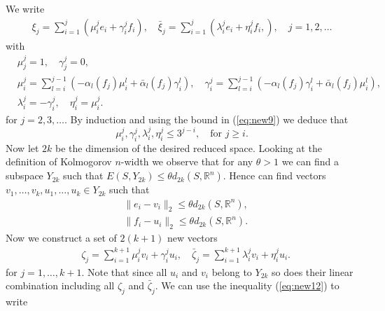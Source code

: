 We write
\begin{equation} \label{eq:new10}
\begin{aligned}
	\xi_j = \sum_{i=1}^j \left( \mu_i^j e_i + \gamma_i^j f_i \right), \quad \bar{\xi}_j = \sum_{i=1}^j \left( \lambda_i^j e_i + \eta_i^j f_i,  \right), \quad j=1,2,\dots
\end{aligned}
\end{equation}
with
\begin{equation} \label{eq:new11}
\begin{aligned}
	&\mu^j_j = 1, \quad \gamma^j_j = 0, \\
	&\mu_i^j = \sum_{l=i}^{j-1}\left( - \alpha_l(f_j) \mu_i^l  + \bar{\alpha}_l(f_j) \gamma_i^l \right), \quad\gamma_i^j = \sum_{l=i}^{j-1}\left( - \alpha_l(f_j) \gamma_i^l  + \bar{\alpha}_l(f_j) \mu_i^l \right), \\
	&\lambda^j_i = - \gamma ^j_i, \quad \eta^j_i = \mu^j_i.
\end{aligned}
\end{equation}
for $j=2,3,\dots$. By induction and using the bound in (\ref{eq:new9}) we deduce that
\begin{equation} \label{eq:new12}
	\mu^j_i,\gamma^j_i,\lambda^j_i,\eta^j_i \leq 3^{j-i}, \quad \text{for } j\geq i.
\end{equation}
Now let $2k$ be the dimension of the desired reduced space. Looking at the definition of Kolmogorov $n$-width we observe that for any $\theta > 1$ we can find a subspace $Y_{2k}$ such that $E(S,Y_{2k}) \leq \theta d_{2k}(S,\mathbb R^n)$. Hence can find vectors $v_1,\dots,v_k,u_1,\dots,u_k\in Y_{2k}$ such that
\begin{equation} \label{eq:new13}
\begin{aligned}
	& \|e_i - v_i\|_2 \leq \theta d_{2k}(S,\mathbb R^n), \\
	& \|f_i - u_i\|_2 \leq \theta d_{2k}(S,\mathbb R^n).
\end{aligned}
\end{equation}
Now we construct a set of $2(k+1)$ new vectors
\begin{equation} \label{eq:new14}
\begin{aligned}
	& \zeta_j = \sum_{i=1}^{k+1} \mu_i^j v_i + \gamma^j_i u_i,\quad \bar{\zeta}_j = \sum_{i=1}^{k+1} \lambda_i^j v_i + \eta^j_i u_i.
\end{aligned}
\end{equation}
for $j = 1,\dots,k+1$. Note that since all $u_i$ and $v_i$ belong to $Y_{2k}$ so does their linear combination including all $\zeta_j$ and $\bar{\zeta}_j$. We can use the inequality (\ref{eq:new12}) to write
